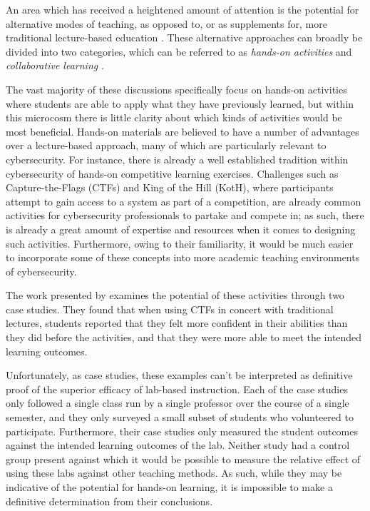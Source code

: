     An area which has received a heightened amount of attention is the potential for alternative modes of teaching, as opposed to, or as supplements for, more traditional lecture-based education \cite{Z-Zeng,N-Eliot,E-Gavas,C-Herr,K-Chung, C-Kussmaul,K-Leune,B-Payne,L-Thomas}. These alternative approaches can broadly be divided into two categories, which can be referred to as \emph{hands-on activities} and \emph{collaborative learning} \cite{P-Deshpande,C-Kussmaul,B-Payne}.



    The vast majority of these discussions specifically focus on hands-on activities where students are able to apply what they have previously learned, but within this microcosm there is little clarity about which kinds of activities would be most beneficial. Hands-on materials are believed to have a number of advantages over a lecture-based approach, many of which are particularly relevant to cybersecurity. For instance, there is already a well established tradition within cybersecurity of hands-on competitive learning exercises. Challenges such as Capture-the-Flags (CTFs) and King of the Hill (KotH), where participants attempt to gain access to a system as part of a competition, are already common activities for cybersecurity professionals to partake and compete in; as such, there is already a great amount of expertise and resources when it comes to designing such activities. Furthermore, owing to their familiarity, it would be much easier to incorporate some of these concepts into more academic teaching environments of cybersecurity.

    The work presented by \textcite{K-Leune} examines the potential of these activities through two case studies. They found that when using CTFs in concert with traditional lectures, students reported that they felt more confident in their abilities than they did before the activities, and that they were more able to meet the intended learning outcomes. 

    Unfortunately, as case studies, these examples can't be interpreted as definitive proof of the superior efficacy of lab-based instruction. Each of the case studies only followed a single class run by a single professor over the course of a single semester, and they only surveyed a small subset of students who volunteered to participate. Furthermore, their case studies only measured the student outcomes against the intended learning outcomes of the lab. Neither study had a control group present against which it would be possible to measure the relative effect of using these labs against other teaching methods. As such, while they may be indicative of the potential for hands-on learning, it is impossible to make a definitive determination from their conclusions.

